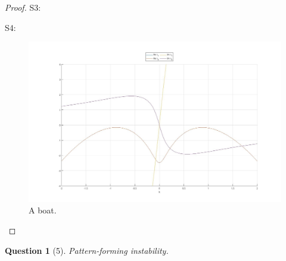 \documentclass[11pt]{article}
\theoremstyle{quest}
\newtheorem*{question}{Question}
\begin{document}
\begin{proof}
    S3: 

    S4:
    \begin{figure}[h!]
        \includegraphics[width=\linewidth]{figures/Q4_fig1.jpg}
        \caption{A boat.}
        \label{fig:boat1}
    \end{figure}

     

\end{proof}
\clearpage
\begin{question}[5]
   Pattern-forming instability. 
\end{question}
\end{document}
